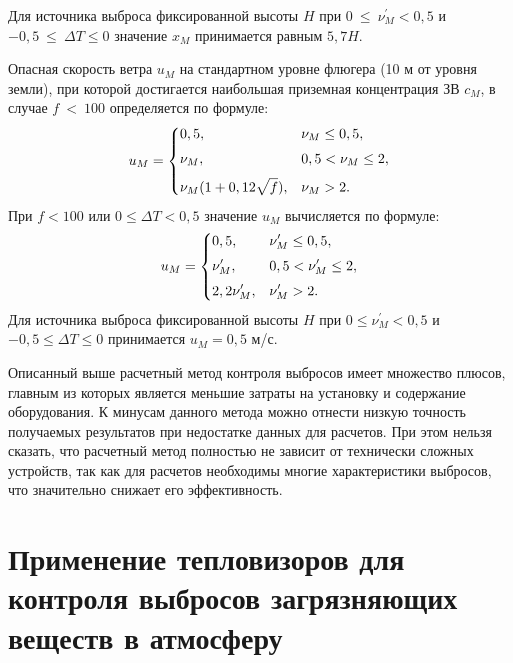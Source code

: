 \documentclass[14pt, a4paper]{extreport}
\begin{document}
	Для источника выброса фиксированной высоты $H$ при $0~\leq~\nu_M^\prime < 0,5$ и $-0,5~\leq~\Delta T \leq 0$ значение $x_M$ принимается равным $5,7H$.
	
	Опасная скорость ветра $u_M$ на стандартном уровне флюгера (10 м от уровня земли), при которой достигается наибольшая приземная концентрация ЗВ $c_M$, в случае $f~<~100$ определяется по формуле:
	\begin{equation*}
		u_M = 
		\begin{dcases}
			0,5, & \nu_M \leq 0,5,  \vspace*{0.1cm} \\
			\nu_M, & 0,5 < \nu_M \leq 2, \vspace*{0.1cm} \\
			\nu_M(1 + 0,12\sqrt{f}), &  \nu_M > 2.
		\end{dcases}
		\label{eq:uM3}
	\end{equation*}
	При $f<100$ или $0 \leq \Delta T < 0,5$ значение $u_M$ вычисляется по формуле:
	\begin{equation*}
		u_M = 
		\begin{dcases}
			0,5, &  \nu_M^\prime \leq 0,5, \vspace*{0.1cm} \\
			\nu_M^\prime, & 0,5 < \nu_M^\prime \leq 2, \vspace*{0.1cm} \\
			2,2 \nu_M^\prime, & \nu_M^\prime > 2.
		\end{dcases}
		\label{eq:uM6}
	\end{equation*}
	Для источника выброса фиксированной высоты $H$ при $0 \leq \nu_M^\prime < 0,5$ и $-0,5 \leq \Delta T \leq 0$ принимается $u_M = 0,5$ м/с.
	
	Описанный выше расчетный метод контроля выбросов имеет множество плюсов, главным из которых является меньшие затраты на установку и содержание оборудования. К минусам данного метода можно отнести низкую точность получаемых результатов при недостатке данных для расчетов. При этом нельзя сказать, что расчетный метод полностью не зависит от технически сложных устройств, так как для расчетов необходимы многие характеристики выбросов, что значительно снижает его эффективность.
	
	\section [\vspace*{-0.22cm}Применение тепловизоров для контроля выбросов загрязняющих \hspace*{-0.9cm} веществ в атмосферу]{\vspace*{-0.22cm}Применение тепловизоров для контроля выбросов загрязняющих \\ \hspace*{-2.25cm} веществ в атмосферу}
\end{document}

